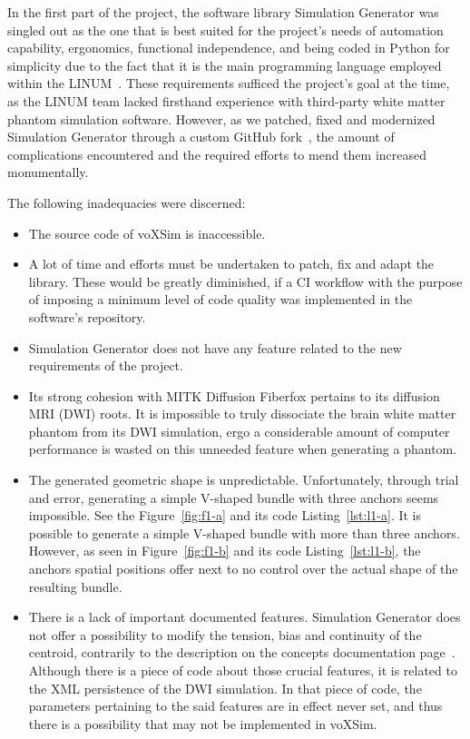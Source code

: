 \documentclass{article}
\begin{document}
  In the first part of the project, the software library Simulation Generator was singled out as the one that is best suited for the project's needs of automation capability, ergonomics, functional independence, and being coded in Python for simplicity due to the fact that it is the main programming language employed within the LINUM~\cite{dubreuil2022inf6200}.
  These requirements sufficed the project's goal at the time, as the LINUM team lacked firsthand experience with third-party white matter phantom simulation software.
  However, as we patched, fixed and modernized Simulation Generator through a custom GitHub fork~\cite{dubreuil2022inm5803simgenfork, valcourtcaron2022simulationgenerator}, the amount of complications encountered and the required efforts to mend them increased monumentally.

  The following inadequacies were discerned:
  \begin{itemize}
    \item The source code of voXSim is inaccessible.
    \item A lot of time and efforts must be undertaken to patch, fix and adapt the library.
    These would be greatly diminished, if a CI workflow with the purpose of imposing a minimum level of code quality was implemented in the software's repository.
    \item Simulation Generator does not have any feature related to the new requirements of the project.
    \item Its strong cohesion with MITK Diffusion Fiberfox pertains to its diffusion MRI (DWI) roots.
    It is impossible to truly dissociate the brain white matter phantom from its DWI simulation, ergo a considerable amount of computer performance is wasted on this unneeded feature when generating a phantom.
    \item The generated geometric shape is unpredictable.
    Unfortunately, through trial and error, generating a simple V-shaped bundle with three anchors seems impossible.
    See the Figure~\ref{fig:f1-a} and its code Listing~\ref{lst:l1-a}.
    It is possible to generate a simple V-shaped bundle with more than three anchors.
    However, as seen in Figure~\ref{fig:f1-b} and its code Listing~\ref{lst:l1-b}, the anchors spatial positions offer next to no control over the actual shape of the resulting bundle.
    \item There is a lack of important documented features.
    Simulation Generator does not offer a possibility to modify the tension, bias and continuity of the centroid, contrarily to the description on the concepts documentation page~\cite{valcourtcaron2022simulationgenerator}.
    Although there is a piece of code about those crucial features, it is related to the XML persistence of the DWI simulation.
    In that piece of code, the parameters pertaining to the said features are in effect never set, and thus there is a possibility that may not be implemented in voXSim.
  \end{itemize}
\end{document}
